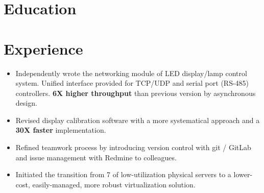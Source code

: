 \documentclass[11pt,a4paper]{moderncv/moderncv}
\begin{document}
\maketitle



\section{Education}


\section{Experience}
{
\begin{itemize}
	\item Independently wrote the networking module of LED display/lamp control system. Unified interface provided for TCP/UDP and serial port (RS-485) controllers. \textbf{6X higher throughput} than previous version by asynchronous design.
	\item Revised display calibration software with a more systematical approach and a \textbf{30X faster} implementation.
	\item Refined teamwork process by introducing version control with git / GitLab and issue management with Redmine to colleagues.
	\item Initiated the transition from 7 of low-utilization physical servers to a lower-cost, easily-managed, more robust virtualization solution.
\end{itemize}
}
\end{document}

